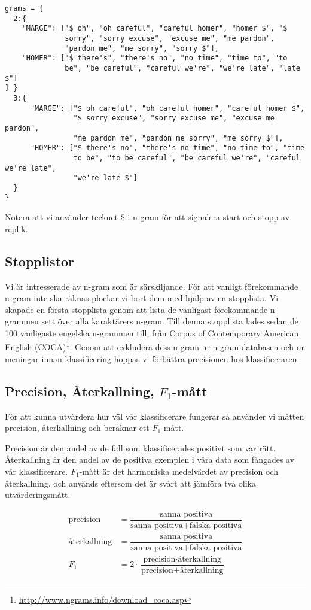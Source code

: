 \documentclass[a4paper]{article}
\begin{document}
\begin{verbatim}
grams = {
  2:{
    "MARGE": ["$ oh", "oh careful", "careful homer", "homer $", "$
              sorry", "sorry excuse", "excuse me", "me pardon",
              "pardon me", "me sorry", "sorry $"],
    "HOMER": ["$ there's", "there's no", "no time", "time to", "to
              be", "be careful", "careful we're", "we're late", "late $"]
] }
  3:{
      "MARGE": ["$ oh careful", "oh careful homer", "careful homer $",
                "$ sorry excuse", "sorry excuse me", "excuse me pardon",
                "me pardon me", "pardon me sorry", "me sorry $"],
      "HOMER": ["$ there's no", "there's no time", "no time to", "time
                to be", "to be careful", "be careful we're", "careful we're late",
                "we're late $"]
  }
}
\end{verbatim}
Notera att vi använder tecknet \$ i n-gram för att signalera start och
stopp av replik.

\subsection{Stopplistor}
Vi är intresserade av n-gram som är särskiljande. För att vanligt förekommande
n-gram inte ska räknas plockar vi bort dem med hjälp av en stopplista. Vi
skapade en första stopplista genom att lista de vanligast förekommande n-grammen
sett över alla karaktärers n-gram. Till denna stopplista lades sedan de 100
vanligaste engelska n-grammen till, från Corpus of Contemporary American English
(COCA)\footnote{\url{http://www.ngrams.info/download_coca.asp}}. Genom att
exkludera dess n-gram ur n-gram-databasen och ur meningar innan klassificering
hoppas vi förbättra precisionen hos klassificeraren.


\subsection{Precision, Återkallning, $F_1$-mått}
För att kunna utvärdera hur väl vår klassificerare fungerar så använder vi
måtten precision, återkallning och beräknar ett $F_1$-mått.

Precision är den andel av de fall som klassificerades positivt som var rätt.
Återkallning är den andel av de positiva exemplen i våra data som fångades av
vår klassificerare. $F_1$-mått är det harmoniska medelvärdet av precision och
återkallning, och används eftersom det är svårt att jämföra två olika
utvärderingsmått.

\begin{align*}
\text{precision}&=\dfrac{\text{sanna positiva}}{\text{sanna positiva} + \text{falska positiva}}\\
\text{återkallning}&=\dfrac{\text{sanna positiva}}{\text{sanna positiva} + \text{falska positiva}}\\
F_1 &= 2 \cdot \dfrac{\text{precision} \cdot \text{återkallning}}{\text{precision} + \text{återkallning}}
\end{align*}
\end{document}
